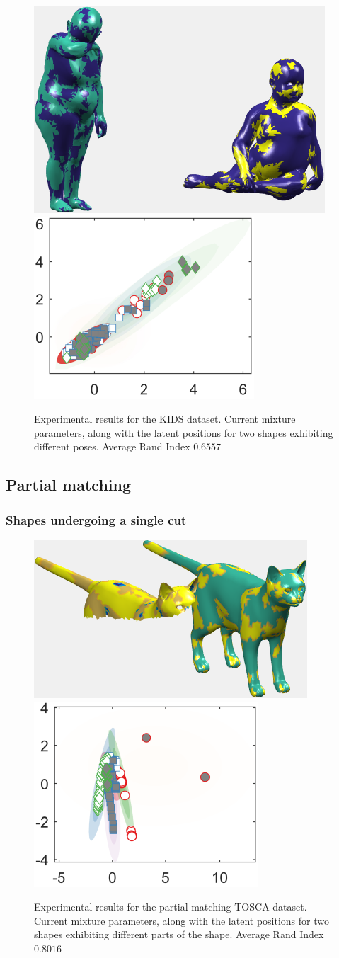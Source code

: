 \documentclass[]{article}
\begin{document}
\begin{figure}[ht!]
	\centering
	
	\includegraphics[width=0.4\linewidth]{img/kid4MVMMexp1}
	\includegraphics[width=0.35\linewidth]{img/kid4MVMMexp3}
	\caption{Experimental results for the KIDS dataset. Current mixture parameters, along with the latent positions for two shapes exhibiting different poses. Average Rand Index $0.6557$ }
\end{figure}

\subsection{Partial matching}

\subsubsection{Shapes undergoing a single cut}
\begin{figure}[ht!]
	\centering
	
	\includegraphics[width=0.4\linewidth]{img/partialCat1MVMMexp1}
	\includegraphics[width=0.35\linewidth]{img/partialCat1MVMMexp3}
	\caption{Experimental results for the partial matching TOSCA dataset. Current mixture parameters, along with the latent positions for two shapes exhibiting different parts of the shape. Average Rand Index $0.8016$ }
\end{figure}
\end{document}
